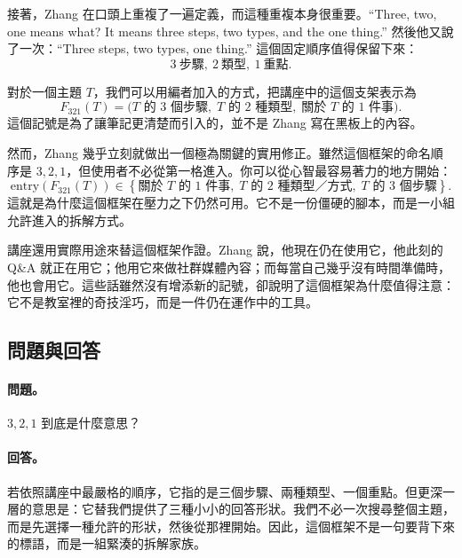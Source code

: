 接著，Zhang 在口頭上重複了一遍定義，而這種重複本身很重要。``Three, two, one means what? It means three steps, two types, and the one thing.'' 然後他又說了一次：``Three steps, two types, one thing.'' 這個固定順序值得保留下來：
\begin{equation}
3\ \text{步驟},\ 2\ \text{類型},\ 1\ \text{重點}.
\end{equation}

\begin{definition}
對於一個主題 \(T\)，我們可以用編者加入的方式，把講座中的這個支架表示為
\begin{equation}
F_{321}(T)
=
\bigl(
\text{\(T\) 的 3 個步驟},\;
\text{\(T\) 的 2 種類型},\;
\text{關於 \(T\) 的 1 件事}
\bigr).
\end{equation}
這個記號是為了讓筆記更清楚而引入的，並不是 Zhang 寫在黑板上的內容。
\end{definition}

然而，Zhang 幾乎立刻就做出一個極為關鍵的實用修正。雖然這個框架的命名順序是 \(3,2,1\)，但使用者不必從第一格進入。你可以從心智最容易著力的地方開始：
\begin{equation}
\text{entry}(F_{321}(T))
\in
\left\{
\text{關於 \(T\) 的 1 件事},\;
\text{\(T\) 的 2 種類型／方式},\;
\text{\(T\) 的 3 個步驟}
\right\}.
\end{equation}
這就是為什麼這個框架在壓力之下仍然可用。它不是一份僵硬的腳本，而是一小組允許進入的拆解方式。

講座還用實際用途來替這個框架作證。Zhang 說，他現在仍在使用它，他此刻的 Q\&A 就正在用它；他用它來做社群媒體內容；而每當自己幾乎沒有時間準備時，他也會用它。這些話雖然沒有增添新的記號，卻說明了這個框架為什麼值得注意：它不是教室裡的奇技淫巧，而是一件仍在運作中的工具。

\subsection{問題與回答}

\paragraph{問題。} \(3,2,1\) 到底是什麼意思？

\paragraph{回答。} 若依照講座中最嚴格的順序，它指的是三個步驟、兩種類型、一個重點。但更深一層的意思是：它替我們提供了三種小小的回答形狀。我們不必一次搜尋整個主題，而是先選擇一種允許的形狀，然後從那裡開始。因此，這個框架不是一句要背下來的標語，而是一組緊湊的拆解家族。

